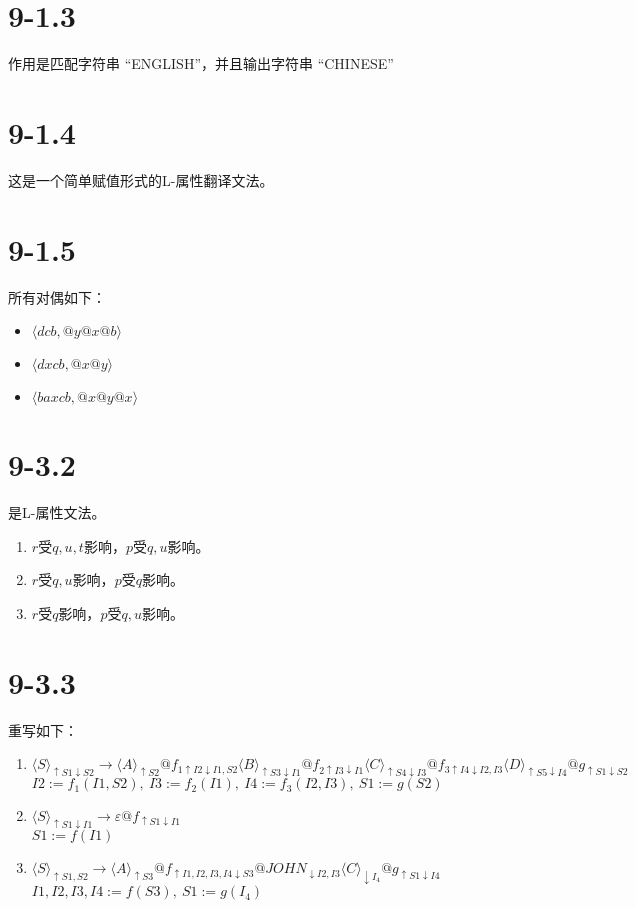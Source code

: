 \documentclass[UTF8]{ctexart}
\begin{document}
\section*{9-1.3}
作用是匹配字符串 ``ENGLISH''，并且输出字符串 ``CHINESE''

\section*{9-1.4}
这是一个简单赋值形式的L-属性翻译文法。

\section*{9-1.5}
所有对偶如下：
\begin{itemize}
    \item $\langle dcb, @y@x@b\rangle$
    \item $\langle dxcb, @x@y\rangle$
    \item $\langle baxcb, @x@y@x\rangle$
\end{itemize}

\section*{9-3.2}
是L-属性文法。

\begin{enumerate}
    \item $r$受$q, u, t$影响，$p$受$q, u$影响。
    \item $r$受$q, u$影响，$p$受$q$影响。
    \item $r$受$q$影响，$p$受$q, u$影响。
\end{enumerate}

\section*{9-3.3}
重写如下：
\begin{enumerate}
    \item $\langle S\rangle_{\uparrow S1\downarrow S2}\to\langle A\rangle_{\uparrow S2}@f_{1\uparrow I2\downarrow I1, S2}\langle B\rangle_{\uparrow S3\downarrow I1}@f_{2\uparrow I3\downarrow I1} \langle C\rangle_{\uparrow S4\downarrow I3}@f_{3\uparrow I4\downarrow I2, I3}\langle D \rangle_{\uparrow S5 \downarrow I4}@g_{\uparrow S1 \downarrow S2}$ \\
    $I2 := f_1(I1, S2),\ I3 := f_2(I1),\ I4 := f_3(I2, I3),\ S1 := g(S2)$
    \item $\langle S \rangle_{\uparrow S1 \downarrow I1} \to \varepsilon @f_{\uparrow S1 \downarrow I1}$ \\
    $S1 := f(I1)$
    \item $\langle S \rangle_{\uparrow S1, S2} \to \langle A \rangle_{\uparrow S3}@f_{\uparrow I1, I2, I3, I4 \downarrow S3} @JOHN_{\downarrow I2, I3} \langle C \rangle_{\downarrow I_4} @g_{\uparrow S1 \downarrow I4}$ \\
    $I1, I2, I3, I4 := f(S3),\ S1 := g(I_4)$
\end{enumerate}
\end{document}
